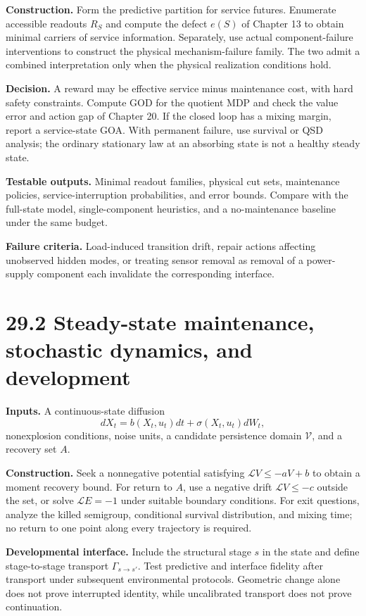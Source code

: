 \documentclass[
  english,
  11pt,
  oneside]{book}
\newcounter{none} %
\begin{document}
\textbf{Construction.} Form the predictive partition for service futures. Enumerate accessible readouts \(R_S\) and compute the defect \(e(S)\) of Chapter 13 to obtain minimal carriers of service information. Separately, use actual component-failure interventions to construct the physical mechanism-failure family. The two admit a combined interpretation only when the physical realization conditions hold.

\textbf{Decision.} A reward may be effective service minus maintenance cost, with hard safety constraints. Compute GOD for the quotient MDP and check the value error and action gap of Chapter 20. If the closed loop has a mixing margin, report a service-state GOA. With permanent failure, use survival or QSD analysis; the ordinary stationary law at an absorbing state is not a healthy steady state.

\textbf{Testable outputs.} Minimal readout families, physical cut sets, maintenance policies, service-interruption probabilities, and error bounds. Compare with the full-state model, single-component heuristics, and a no-maintenance baseline under the same budget.

\textbf{Failure criteria.} Load-induced transition drift, repair actions affecting unobserved hidden modes, or treating sensor removal as removal of a power-supply component each invalidate the corresponding interface.

\section{29.2 Steady-state maintenance, stochastic dynamics, and development}\label{steady-state-maintenance-stochastic-dynamics-and-development}

\textbf{Inputs.} A continuous-state diffusion \[dX_t=b(X_t,u_t)dt+\sigma(X_t,u_t)dW_t,\] nonexplosion conditions, noise units, a candidate persistence domain \(\mathcal V\), and a recovery set \(A\).

\textbf{Construction.} Seek a nonnegative potential satisfying \(\mathcal LV\le-aV+b\) to obtain a moment recovery bound. For return to \(A\), use a negative drift \(\mathcal LV\le-c\) outside the set, or solve \(\mathcal LE=-1\) under suitable boundary conditions. For exit questions, analyze the killed semigroup, conditional survival distribution, and mixing time; no return to one point along every trajectory is required.

\textbf{Developmental interface.} Include the structural stage \(s\) in the state and define stage-to-stage transport \(\Gamma_{s\to s'}\). Test predictive and interface fidelity after transport under subsequent environmental protocols. Geometric change alone does not prove interrupted identity, while uncalibrated transport does not prove continuation.
\end{document}
